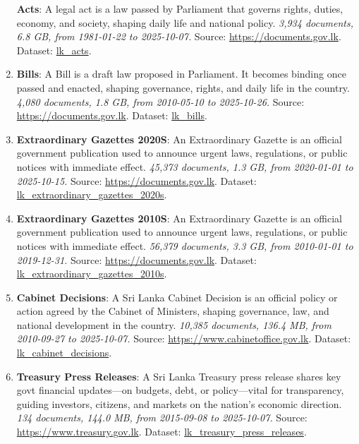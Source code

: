 \documentclass[10pt,a4paper]{article}%
\begin{document}
\begin{enumerate}
\textbf{Acts}: A legal act is a law passed by Parliament that governs rights, duties, economy, and society, shaping daily life and national policy.\textit{ 3,934 documents, 6.8 GB, from 1981{-}01{-}22 to 2025{-}10{-}07.} Source: \href{https://documents.gov.lk}{https://documents.gov.lk}. Dataset: \href{https://github.com/nuuuwan/lk\_legal\_docs/tree/data\_lk\_acts/data/lk\_acts}{lk\_acts}.%
\item%
\textbf{Bills}: A Bill is a draft law proposed in Parliament. It becomes binding once passed and enacted, shaping governance, rights, and daily life in the country.\textit{ 4,080 documents, 1.8 GB, from 2010{-}05{-}10 to 2025{-}10{-}26.} Source: \href{https://documents.gov.lk}{https://documents.gov.lk}. Dataset: \href{https://github.com/nuuuwan/lk\_legal\_docs/tree/data\_lk\_bills/data/lk\_bills}{lk\_bills}.%
\item%
\textbf{Extraordinary Gazettes 2020S}: An Extraordinary Gazette is an official government publication used to announce urgent laws, regulations, or public notices with immediate effect.\textit{ 45,373 documents, 1.3 GB, from 2020{-}01{-}01 to 2025{-}10{-}15.} Source: \href{https://documents.gov.lk}{https://documents.gov.lk}. Dataset: \href{https://github.com/nuuuwan/lk\_legal\_docs/tree/data\_lk\_extraordinary\_gazettes\_2020s/data/lk\_extraordinary\_gazettes\_2020s}{lk\_extraordinary\_gazettes\_2020s}.%
\item%
\textbf{Extraordinary Gazettes 2010S}: An Extraordinary Gazette is an official government publication used to announce urgent laws, regulations, or public notices with immediate effect.\textit{ 56,379 documents, 3.3 GB, from 2010{-}01{-}01 to 2019{-}12{-}31.} Source: \href{https://documents.gov.lk}{https://documents.gov.lk}. Dataset: \href{https://github.com/nuuuwan/lk\_legal\_docs/tree/data\_lk\_extraordinary\_gazettes\_2010s/data/lk\_extraordinary\_gazettes\_2010s}{lk\_extraordinary\_gazettes\_2010s}.%
\item%
\textbf{Cabinet Decisions}: A Sri Lanka Cabinet Decision is an official policy or action agreed by the Cabinet of Ministers, shaping governance, law, and national development in the country.\textit{ 10,385 documents, 136.4 MB, from 2010{-}09{-}27 to 2025{-}10{-}07.} Source: \href{https://www.cabinetoffice.gov.lk}{https://www.cabinetoffice.gov.lk}. Dataset: \href{https://github.com/nuuuwan/lk\_cabinet\_decisions/tree/data/data/lk\_cabinet\_decisions}{lk\_cabinet\_decisions}.%
\item%
\textbf{Treasury Press Releases}: A Sri Lanka Treasury press release shares key govt financial updates—on budgets, debt, or policy—vital for transparency, guiding investors, citizens, and markets on the nation’s economic direction.\textit{ 134 documents, 144.0 MB, from 2015{-}09{-}08 to 2025{-}10{-}07.} Source: \href{https://www.treasury.gov.lk}{https://www.treasury.gov.lk}. Dataset: \href{https://github.com/nuuuwan/lk\_treasury/tree/data\_lk\_treasury\_press\_releases/data/lk\_treasury\_press\_releases}{lk\_treasury\_press\_releases}.%

\end{enumerate}
\end{document}
